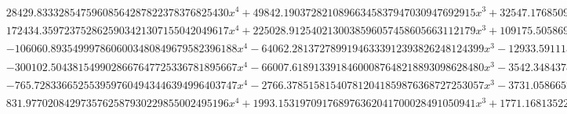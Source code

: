 \documentclass{article}
\begin{document}
\begin{landscape}
\begin{eqnarray*}
\begin{array}{cc}
\begin{array}{cc}
 28429.83332854759608564287822378376825430 x^4+49842.19037282108966345837947030947692915 x^3+32547.17685097074661789166452214659874874 x^2+9380.022084071335604055759220947991746492 x+1006.573873915250709226580827375429275542 & x\geq -\frac{1}{2}\land x<-\frac{3}{8} \\
 172434.3597237528625903421307155042049617 x^4+225028.9125402130038596057458605663112179 x^3+109175.5058697270187762749494715106522005 x^2+23320.32522025868682467855130955370948773 x+1848.945322285657347687281072915177443361 & x\geq -\frac{3}{8}\land x<-\frac{1}{4} \\
 -106060.8935499978606003480849679582396188 x^4-64062.28137278991946333912393826248124399 x^3-12933.59111376888307793698029506803351396 x^2-935.5777424106361787933889666716375691877 x-12.38967870326145174983832132316617178851 & x\geq -\frac{1}{4}\land x<-\frac{1}{8} \\
 -300102.5043815499028667647725336781895667 x^4-66007.61891339184600087648218893098628480 x^3-3542.348437854078710467377256089441424825 x^2-12.52946083772011068530491053409048208449 x-0.1728575573820139277186280106256140459031 & x\geq -\frac{1}{8}\land x<0 \\
 -765.7283366525539597604943446394996403747 x^4-2766.378515815407812041859876368727253057 x^3-3731.058665293322630740854508037626486453 x^2-2225.895129750637664398106765527069775233 x-495.4866436201688859386177892186709014623 & x\geq -1\land x<-\frac{3}{4} \\
 831.9770208429735762587930229855002495196 x^4+1993.153197091768976362041700028491050941 x^3+1771.168135226160156960333813773494046748 x^2+691.8630962714284037546392398864924507676 x+100.2329312168175452583166177027243187000 & x\geq -\frac{3}{4}\land x<-\frac{1}{2}
\end{array}


\end{array}
\end{eqnarray*}
\end{landscape}
\end{document}
